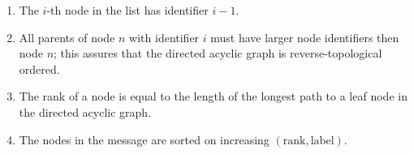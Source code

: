 \documentclass{article}
\begin{document}
\begin{enumerate}
    \item The $i$-th node in the list has identifier $i-1$.
    \item All parents of node $n$ with identifier $i$ must have larger node identifiers then node $n$; this assures that the directed acyclic graph is reverse-topological ordered.
    \item The rank of a node is equal to the length of the longest path to a leaf node in the directed acyclic graph.
    \item The nodes in the message are sorted on increasing $(\mathrm{rank}, \mathrm{label})$.
\end{enumerate}
\end{document}
